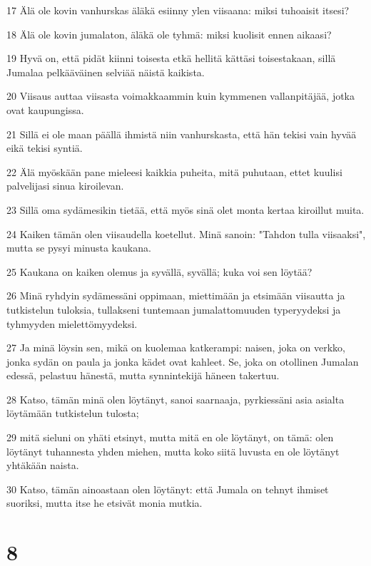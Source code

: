 \par 17 Älä ole kovin vanhurskas äläkä esiinny ylen viisaana: miksi tuhoaisit itsesi?
\par 18 Älä ole kovin jumalaton, äläkä ole tyhmä: miksi kuolisit ennen aikaasi?
\par 19 Hyvä on, että pidät kiinni toisesta etkä hellitä kättäsi toisestakaan, sillä Jumalaa pelkääväinen selviää näistä kaikista.
\par 20 Viisaus auttaa viisasta voimakkaammin kuin kymmenen vallanpitäjää, jotka ovat kaupungissa.
\par 21 Sillä ei ole maan päällä ihmistä niin vanhurskasta, että hän tekisi vain hyvää eikä tekisi syntiä.
\par 22 Älä myöskään pane mieleesi kaikkia puheita, mitä puhutaan, ettet kuulisi palvelijasi sinua kiroilevan.
\par 23 Sillä oma sydämesikin tietää, että myös sinä olet monta kertaa kiroillut muita.
\par 24 Kaiken tämän olen viisaudella koetellut. Minä sanoin: "Tahdon tulla viisaaksi", mutta se pysyi minusta kaukana.
\par 25 Kaukana on kaiken olemus ja syvällä, syvällä; kuka voi sen löytää?
\par 26 Minä ryhdyin sydämessäni oppimaan, miettimään ja etsimään viisautta ja tutkistelun tuloksia, tullakseni tuntemaan jumalattomuuden typeryydeksi ja tyhmyyden mielettömyydeksi.
\par 27 Ja minä löysin sen, mikä on kuolemaa katkerampi: naisen, joka on verkko, jonka sydän on paula ja jonka kädet ovat kahleet. Se, joka on otollinen Jumalan edessä, pelastuu hänestä, mutta synnintekijä häneen takertuu.
\par 28 Katso, tämän minä olen löytänyt, sanoi saarnaaja, pyrkiessäni asia asialta löytämään tutkistelun tulosta;
\par 29 mitä sieluni on yhäti etsinyt, mutta mitä en ole löytänyt, on tämä: olen löytänyt tuhannesta yhden miehen, mutta koko siitä luvusta en ole löytänyt yhtäkään naista.
\par 30 Katso, tämän ainoastaan olen löytänyt: että Jumala on tehnyt ihmiset suoriksi, mutta itse he etsivät monia mutkia.

\chapter{8}

